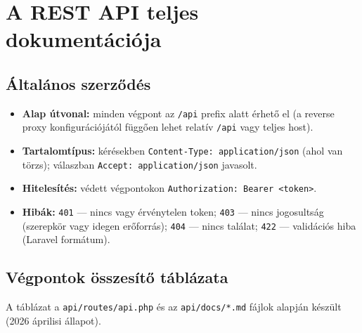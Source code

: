 \chapter{A REST API teljes dokumentációja}

\section{Általános szerződés}
\begin{itemize}
  \item \textbf{Alap útvonal:} minden végpont az \texttt{/api} prefix alatt érhető el (a reverse proxy konfigurációjától függően lehet relatív \texttt{/api} vagy teljes host).
  \item \textbf{Tartalomtípus:} kérésekben \texttt{Content-Type: application/json} (ahol van törzs); válaszban \texttt{Accept: application/json} javasolt.
  \item \textbf{Hitelesítés:} védett végpontokon \texttt{Authorization: Bearer <token>}.
  \item \textbf{Hibák:} \texttt{401} — nincs vagy érvénytelen token; \texttt{403} — nincs jogosultság (szerepkör vagy idegen erőforrás); \texttt{404} — nincs találat; \texttt{422} — validációs hiba (Laravel formátum).
\end{itemize}

\section{Végpontok összesítő táblázata}
A táblázat a \texttt{api/routes/api.php} és az \texttt{api/docs/*.md} fájlok alapján készült (2026 áprilisi állapot).

